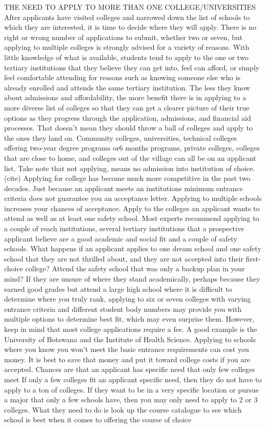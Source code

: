 THE NEED TO APPLY TO MORE THAN ONE COLLEGE/UNIVERSITIES\\
After applicants have visited colleges and narrowed down the list of schools to which they are interested, it is time to decide where they will apply. There is no right or wrong number of applications to submit, whether two or seven, but applying to multiple colleges is strongly advised for a variety of reasons. With little knowledge of what is available, students tend to apply to the one or two tertiary institutions that they believe they can get into, feel can afford, or simply feel comfortable attending for reasons such as knowing someone else who is already enrolled and attends the same tertiary institution. The less they know about admissions and affordability, the more benefit there is in applying to a more diverse list of colleges so that they can get a clearer picture of their true options as they progress through the application, admissions, and financial aid processes. That doesn't mean they should throw a ball of colleges and apply to the ones they land on. Community colleges, universities, technical colleges offering two-year degree programs or6 months programs, private colleges, colleges that are close to home, and colleges out of the village can all be on an applicant list. Take note that not applying, means no admission into institution of choice. (cite)
Applying for college has become much more competitive in the past two decades.
Just because an applicant meets an institutions minimum entrance criteria does not guarantee you an acceptance letter. Applying to multiple schools increases your chances of acceptance.
Apply to the colleges an applicant wants to attend as well as at least one safety school.
Most experts recommend applying to a couple of reach institutions, several tertiary institutions that a prospective applicant believe are a good academic and social fit and a couple of safety schools.
What happens if an applicant applies to one dream school and one safety school that they are not thrilled about, and they are not accepted into their first-choice college? Attend the safety school that was only a backup plan in your mind? If they are unsure of where they stand academically, perhaps because they earned good grades but attend a large high school where it is difficult to determine where you truly rank, applying to six or seven colleges with varying entrance criteria and different student body numbers may provide you with multiple options to determine best fit, which may even surprise them. However, keep in mind that most college applications require a fee. A good example is the University of Botswana and the Institute of Health Science. Applying to schools where you know you won't meet the basic entrance requirements can cost you money. It is best to save that money and put it toward college costs if you are accepted.
Chances are that an applicant has specific need that only few colleges meet
If only a few colleges fit an applicant specific need, then they do not have to apply to a ton of colleges. If they want to be in a very specific location or pursue a major that only a few schools have, then you may only need to apply to 2 or 3 colleges. What they need to do is look up the course catalogue to see which school is best when it comes to offering the course of choice

